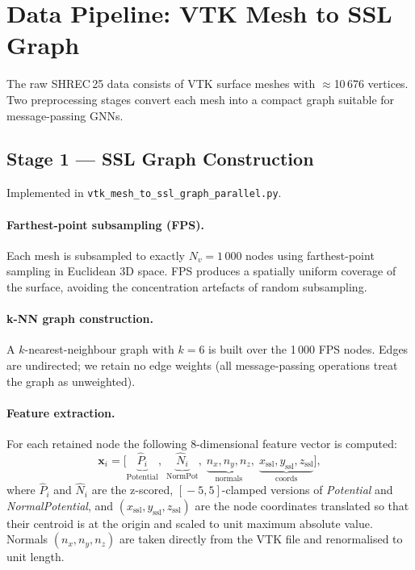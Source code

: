 \section{Data Pipeline: VTK Mesh to SSL Graph}
\label{sec:pipeline}

The raw SHREC\,25 data consists of VTK surface meshes with
$\approx$10\,676 vertices.
Two preprocessing stages convert each mesh into a compact graph suitable for
message-passing GNNs.

\subsection{Stage 1 --- SSL Graph Construction}
\label{sec:pipeline:ssl}

Implemented in \texttt{vtk\_mesh\_to\_ssl\_graph\_parallel.py}.

\paragraph{Farthest-point subsampling (FPS).}
Each mesh is subsampled to exactly $N_v = 1\,000$ nodes using farthest-point
sampling in Euclidean 3D space.
FPS produces a spatially uniform coverage of the surface, avoiding the
concentration artefacts of random subsampling.

\paragraph{k-NN graph construction.}
A $k$-nearest-neighbour graph with $k=6$ is built over the 1\,000 FPS
nodes.
Edges are undirected; we retain no edge weights (all message-passing
operations treat the graph as unweighted).

\paragraph{Feature extraction.}
For each retained node the following 8-dimensional feature vector is computed:
\begin{equation}
  \mathbf{x}_i = \bigl[
    \underbrace{\hat{P}_i}_{\text{Potential}},\;
    \underbrace{\hat{N}_i}_{\text{NormPot}},\;
    \underbrace{n_x, n_y, n_z}_{\text{normals}},\;
    \underbrace{x_\text{ssl}, y_\text{ssl}, z_\text{ssl}}_{\text{coords}}
  \bigr],
  \label{eq:feature_vec}
\end{equation}
where $\hat{P}_i$ and $\hat{N}_i$ are the z-scored, $[\!-5,5\!]$-clamped
versions of \textit{Potential} and \textit{NormalPotential}, and
$(x_\text{ssl}, y_\text{ssl}, z_\text{ssl})$ are the node coordinates
translated so that their centroid is at the origin and scaled to unit
maximum absolute value.
Normals $(n_x, n_y, n_z)$ are taken directly from the VTK file and
renormalised to unit length.

